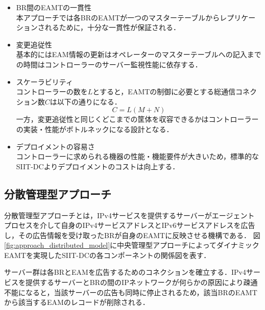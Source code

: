 \begin{itemize}
    \item BR間のEAMTの一貫性 \\
    本アプローチでは各BRのEAMTが一つのマスターテーブルからレプリケーションされるために，十分な一貫性が保証される．
    \item 変更追従性 \\
    基本的にはEAM情報の更新はオペレーターのマスターテーブルへの記入までの時間はコントローラーのサーバー監視性能に依存する．
    \item スケーラビリティ　\\
    コントローラーの数を$L$とすると，EAMTの制御に必要とする総通信コネクション数$C$は以下の通りになる．
    \begin{equation}
        C = L(M + N)
    \end{equation}
    一方，変更追従性と同じくどこまでの筐体を収容できるかはコントローラーの実装・性能がボトルネックになる設計となる．
    \item デプロイメントの容易さ　\\
    コントローラーに求められる機器の性能・機能要件が大きいため，標準的なSIIT-DCよりデプロイメントのコストは向上する．

\end{itemize}



\subsection{分散管理型アプローチ}
分散管理型アプローチとは，IPv4サービスを提供するサーバーがエージェントプロセスを介して自身のIPv4サービスアドレスとIPv6サービスアドレスを広告し，その広告情報を受け取ったBRが自身のEAMTに反映させる機構である．
図\ref{fig:approach_distributed_model}に中央管理型アプローチによってダイナミックEAMTを実現したSIIT-DCの各コンポーネントの関係図を表す．

サーバー群は各BRとEAMを広告するためのコネクションを確立する．IPv4サービスを提供するサーバーとBRの間のIPネットワークが何らかの原因により疎通不能になると，当該サーバーの広告も同時に停止されるため，該当BRのEAMTから該当するEAMのレコードが削除される．



